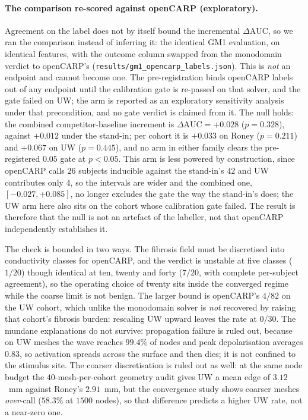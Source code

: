 \documentclass[11pt]{article}
\theoremstyle{definition}
\newcommand{\dAUC}{\Delta\mathrm{AUC}}
\newcommand{\code}[1]{\texttt{#1}}
\begin{document}
\paragraph{The comparison re-scored against openCARP (exploratory).} Agreement on
the label does not by itself bound the incremental $\dAUC$, so we ran the
comparison instead of inferring it: the identical GM1 evaluation, on identical
features, with the outcome column swapped from the monodomain verdict to
openCARP's
(\code{results/\allowbreak gm1\allowbreak\_opencarp\allowbreak\_labels.json}).
This is \emph{not} an endpoint and cannot become one. The pre-registration binds
openCARP labels out of any endpoint until the calibration gate is re-passed on
that solver, and the gate failed on UW; the arm is reported as an exploratory
sensitivity analysis under that precondition, and no gate verdict
is claimed from it. The null holds: the combined competitor-baseline increment is $\dAUC=+0.028$
($p=0.328$), against $+0.012$ under the stand-in; per cohort it is $+0.033$ on
Roney ($p=0.211$) and $+0.067$ on UW ($p=0.445$), and no arm in either family
clears the pre-registered $0.05$ gate at $p<0.05$. This arm is less
powered by construction, since openCARP calls $26$ subjects inducible against the
stand-in's $42$ and UW contributes only $4$, so the intervals are wider and
the combined one, $[-0.027,+0.085]$, no longer excludes the gate the way the
stand-in's does; the UW arm here also sits on the cohort whose calibration gate
failed. The result is therefore that the null is not an artefact of the
labeller, not that openCARP independently establishes it.

The check is bounded in two ways. The
fibrosis field must be discretised into conductivity classes for openCARP, and the
verdict is unstable at five classes ($1/20$) though identical at ten, twenty and
forty ($7/20$, with complete per-subject agreement), so the operating choice of
twenty sits inside the converged regime while the coarse limit is not benign. The
larger bound is openCARP's $4/82$ on the UW cohort, which unlike the monodomain
solver is \emph{not} recovered by raising that cohort's fibrosis burden:
rescaling UW upward leaves the rate at $0/30$. The mundane explanations do not
survive: propagation failure is ruled out, because on UW meshes the wave reaches
$99.4\%$ of nodes and peak depolarisation averages $0.83$, so activation spreads
across the surface and then dies; it is not confined to the stimulus site.
The coarser discretisation is ruled out as well: at the same node budget the
$40$-mesh-per-cohort geometry audit gives UW a mean edge of $3.12$~mm against
Roney's $2.91$~mm, but the convergence
study shows coarser meshes \emph{over}-call ($58.3\%$ at $1500$ nodes), so that
difference predicts a higher UW rate, not a near-zero one.
\end{document}
